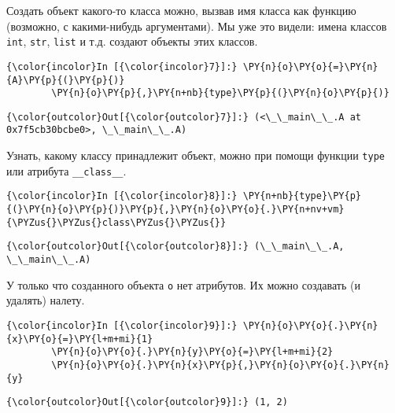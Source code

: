     Создать объект какого-то класса можно, вызвав имя класса как функцию
(возможно, с какими-нибудь аргументами). Мы уже это видели: имена
классов \texttt{int}, \texttt{str}, \texttt{list} и т.д. создают объекты
этих классов.

    \begin{Verbatim}[commandchars=\\\{\}]
{\color{incolor}In [{\color{incolor}7}]:} \PY{n}{o}\PY{o}{=}\PY{n}{A}\PY{p}{(}\PY{p}{)}
        \PY{n}{o}\PY{p}{,}\PY{n+nb}{type}\PY{p}{(}\PY{n}{o}\PY{p}{)}
\end{Verbatim}

            \begin{Verbatim}[commandchars=\\\{\}]
{\color{outcolor}Out[{\color{outcolor}7}]:} (<\_\_main\_\_.A at 0x7f5cb30bcbe0>, \_\_main\_\_.A)
\end{Verbatim}
        
    Узнать, какому классу принадлежит объект, можно при помощи функции
\texttt{type} или атрибута \texttt{\_\_class\_\_}.

    \begin{Verbatim}[commandchars=\\\{\}]
{\color{incolor}In [{\color{incolor}8}]:} \PY{n+nb}{type}\PY{p}{(}\PY{n}{o}\PY{p}{)}\PY{p}{,}\PY{n}{o}\PY{o}{.}\PY{n+nv+vm}{\PYZus{}\PYZus{}class\PYZus{}\PYZus{}}
\end{Verbatim}

            \begin{Verbatim}[commandchars=\\\{\}]
{\color{outcolor}Out[{\color{outcolor}8}]:} (\_\_main\_\_.A, \_\_main\_\_.A)
\end{Verbatim}
        
    У только что созданного объекта \texttt{o} нет атрибутов. Их можно
создавать (и удалять) налету.

    \begin{Verbatim}[commandchars=\\\{\}]
{\color{incolor}In [{\color{incolor}9}]:} \PY{n}{o}\PY{o}{.}\PY{n}{x}\PY{o}{=}\PY{l+m+mi}{1}
        \PY{n}{o}\PY{o}{.}\PY{n}{y}\PY{o}{=}\PY{l+m+mi}{2}
        \PY{n}{o}\PY{o}{.}\PY{n}{x}\PY{p}{,}\PY{n}{o}\PY{o}{.}\PY{n}{y}
\end{Verbatim}

            \begin{Verbatim}[commandchars=\\\{\}]
{\color{outcolor}Out[{\color{outcolor}9}]:} (1, 2)
\end{Verbatim}
        
